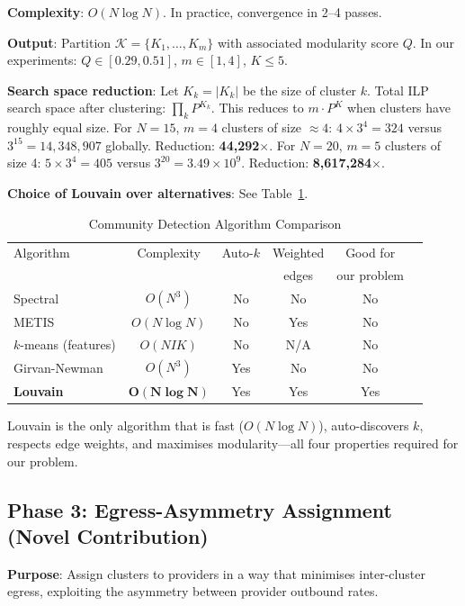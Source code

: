 \documentclass[10pt,journal]{IEEEtran}
\begin{document}
\textbf{Complexity}: $O(N\log N)$. In practice, convergence in 2--4 passes.

\textbf{Output}: Partition $\mathcal{K} = \{K_1,\ldots,K_m\}$ with associated
modularity score $Q$. In our experiments: $Q \in [0.29, 0.51]$, $m \in [1, 4]$,
$K \leq 5$.

\textbf{Search space reduction}:
Let $K_k = |K_k|$ be the size of cluster $k$.
Total ILP search space after clustering: $\prod_k P^{K_k}$.
This reduces to $m \cdot P^K$ when clusters have roughly equal size.
For $N=15$, $m=4$ clusters of size $\approx 4$:
$4 \times 3^4 = 324$ versus $3^{15} = 14{,}348{,}907$ globally.
Reduction: \textbf{44{,}292$\times$}.
For $N=20$, $m=5$ clusters of size 4:
$5 \times 3^4 = 405$ versus $3^{20} = 3.49\times10^9$.
Reduction: \textbf{8{,}617{,}284$\times$}.

\textbf{Choice of Louvain over alternatives}:
See Table~\ref{tab:comm_compare}.

\begin{table}[ht]
\centering
\caption{Community Detection Algorithm Comparison}
\label{tab:comm_compare}
\setlength{\tabcolsep}{4pt}
\begin{tabular}{lccccc}
\toprule
Algorithm & Complexity & Auto-$k$ & Weighted & Good for\\
& & & edges & our problem\\
\midrule
Spectral~\cite{vonluxburg2007} & $O(N^3)$ & No  & No  & No\\
METIS~\cite{karypis1998}       & $O(N\log N)$ & No & Yes & No\\
$k$-means (features)           & $O(NIK)$ & No  & N/A & No\\
Girvan-Newman~\cite{newman2004} & $O(N^3)$ & Yes & No & No\\
\textbf{Louvain~\cite{blondel2008}} & $\mathbf{O(N\log N)}$ & Yes & Yes & Yes\\
\bottomrule
\end{tabular}
\end{table}

Louvain is the only algorithm that is fast ($O(N\log N)$), auto-discovers $k$,
respects edge weights, and maximises modularity---all four properties required
for our problem.

\subsection{Phase 3: Egress-Asymmetry Assignment (Novel Contribution)}

\textbf{Purpose}: Assign clusters to providers in a way that minimises
inter-cluster egress, exploiting the asymmetry between provider outbound rates.
\end{document}

